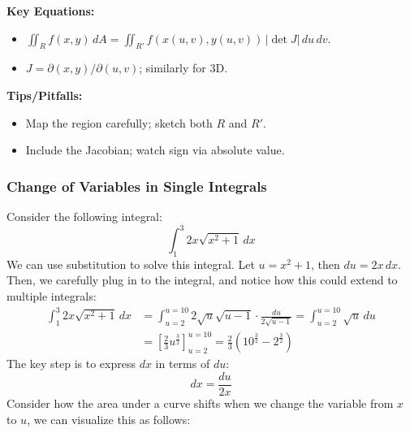 \documentclass[11pt]{report}
\begin{document}
\begin{keybox}
	\textbf{Key Equations:}
\begin{itemize}
    \item $\displaystyle \iint_R f(x,y)\,dA = \iint_{R'} f(x(u,v),y(u,v))\,\left|\det J\right|\,du\,dv$.
    \item $J=\partial(x,y)/\partial(u,v)$; similarly for 3D.
\end{itemize}
	\textbf{Tips/Pitfalls:}
\begin{itemize}
    \item Map the region carefully; sketch both $R$ and $R'$.
    \item Include the Jacobian; watch sign via absolute value.
\end{itemize}
\end{keybox}
\begin{shaded}
    \subsubsection{Change of Variables in Single Integrals}
    Consider the following integral:
    $$
        \int_1^3 2x\sqrt{x^2 +1} \, dx
    $$
    We can use substitution to solve this integral. Let $u = x^2 + 1$, then $du = 2x \, dx$. Then, we carefully plug in to the integral, and notice how this could extend to multiple integrals:
    \begin{align*}
        \int_1^3 2x\sqrt{x^2 +1} \, dx &= \int_{u=2}^{u=10} 2 \sqrt{u} \sqrt{u-1} \cdot \frac{du}{2\sqrt{u-1}} = \int_{u=2}^{u=10} \sqrt{u} \, du \\
        &= \left[ \frac{2}{3} u^{\frac{3}{2}} \right]_{u=2}^{u=10} = \frac{2}{3} (10^{\frac{3}{2}} - 2^{\frac{3}{2}})
    \end{align*}
    The key step is to express $dx$ in terms of $du$:
    $$        
    dx = \frac{du}{2x}
    $$
    Consider how the area under a curve shifts when we change the variable from $x$ to $u$, we can visualize this as follows:
    \end{shaded}
    \newpage
\end{document}
